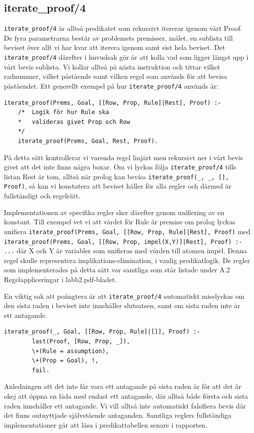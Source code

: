 \documentclass[a4paper]{article}
\begin{document}
\subsection{iterate\_proof/4}
\label{subsec:iterateproof}
\texttt{iterate_proof/4} är alltså predikatet som rekursivt itererar igenom vårt Proof. De fyra parametrarna består av problemets premisser, målet, en sublista till beviset över allt vi har kvar att iterera igenom samt sist hela beviset. Det \texttt{iterate_proof/4} därefter i huvudsak gör är att kolla vad som ligger längst upp i vårt bevis sublista. Vi kollar alltså på nästa instruktion och tittar vilket radnummer, vilket påstående samt vilken regel som används för att bevisa påståendet. Ett generellt exempel på hur \texttt{iterate_proof/4} används är: 
\begin{verbatim}
iterate_proof(Prems, Goal, [[Row, Prop, Rule]|Rest], Proof) :-
	/*	Logik för hur Rule ska 
	* 	valideras givet Prop och Row 
	*/
	iterate_proof(Prems, Goal, Rest, Proof).
\end{verbatim}
På detta sätt kontrollerar vi varenda regel linjärt men rekursivt ner i vårt bevis givet att det inte finns några boxar. Om vi lyckas följa \texttt{iterate_proof/4} tills listan Rest är tom, alltså när prolog kan bevisa \texttt{iterate_proof(_, _, [], Proof)}, så kan vi konstatera att beviset håller för alla regler och därmed är fullständigt och regelrätt.

Implementationen av specifika regler sker därefter genom unifiering av en konstant. Till exempel vet vi att värdet för Rule är premise om prolog lyckas unifiera \texttt{iterate_proof(Prems, Goal, [[Row, Prop, Rule]|Rest], Proof)} med \texttt{iterate_proof(Prems, Goal, [[Row, Prop, impel(X,Y)]|Rest], Proof) :- ...} där X och Y är variabler som unifieras med värden till atomen impel. Denna regel skulle representera implikations-elimination, i vanlig predikatlogik. De regler som implementerades på detta sätt var samtliga som står listade under A.2 Regelappliceringar i labb2.pdf-bladet. 

En viktig sak att poängtera är att \texttt{iterate_proof/4} automatiskt misslyckas om den sista raden i beviset inte innehåller slutsatsen, samt om sista raden inte är ett antagande.

\begin{verbatim}
iterate_proof(_, Goal, [[Row, Prop, Rule]|[]], Proof) :-
        last(Proof, [Row, Prop, _]),
        \+(Rule = assumption),
        \+(Prop = Goal), !,
        fail.
\end{verbatim} 
Anledningen att det inte får vara ett antagande på sista raden är för att det är okej att öppna en låda med endast ett antagande, där alltså både första och sista raden innehåller ett antagande. Vi vill alltså inte automatiskt falsifiera bevis där det finns outnyttjade självstående antaganden. Samtliga reglers fullständiga implementationer går att läsa i predikattabellen senare i rapporten.
\end{document}
